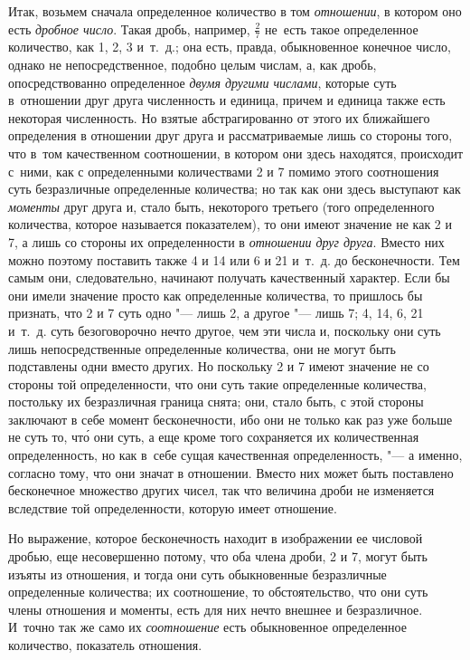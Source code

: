 Итак, возьмем сначала определенное количество в том {\em отношении}, в котором
оно есть {\em дробное число}. Такая дробь, например, $\frac 2 7$ не~есть такое
определенное количество, как 1, 2, 3 и~т.~д.; она есть, правда, обыкновенное
конечное число, однако не непосредственное, подобно целым числам, а, как дробь,
опосредствованно определенное {\em двумя другими числами}, которые суть
в~отношении друг друга численность и единица, причем и единица также есть
некоторая численность. Но взятые абстрагированно от этого их ближайшего
определения в отношении друг друга и рассматриваемые лишь со стороны того,
что в~том качественном соотношении, в котором они здесь находятся, происходит
с~ними, как с определенными количествами 2 и 7 помимо этого соотношения суть
безразличные определенные количества; но так как они здесь выступают как
{\em моменты} друг друга и, стало быть, некоторого третьего (того определенного
количества, которое называется показателем), то они имеют значение не как 2 и
7, а лишь со стороны их определенности в {\em отношении друг друга}. Вместо них
можно поэтому поставить также 4 и 14 или 6 и 21 и~т.~д. до бесконечности. Тем
самым они, следовательно, начинают получать качественный характер. Если бы они
имели значение просто как определенные количества, то пришлось бы признать, что
2 и 7 суть одно "--- лишь 2, а другое "--- лишь 7; 4, 14, 6, 21 и~т.~д. суть
безоговорочно нечто другое, чем эти числа и, поскольку они суть лишь
непосредственные определенные количества, они не могут быть подставлены одни
вместо других. Но поскольку 2 и 7 имеют значение не со стороны той
определенности, что они суть такие определенные количества, постольку их
безразличная граница снята; они, стало быть, с этой стороны заключают в себе
момент бесконечности, ибо они не только как раз уже больше не суть то, чт\'{о}
они суть, а еще кроме того сохраняется их количественная определенность, но как
в~себе сущая качественная определенность, "--- а именно, согласно тому, что они
значат в отношении. Вместо них может быть поставлено бесконечное множество
других чисел, так что величина дроби не изменяется вследствие той
определенности, которую имеет отношение.

Но выражение, которое бесконечность находит в изображении ее числовой дробью,
еще несовершенно потому, что оба члена дроби, 2 и 7, могут быть изъяты из
отношения, и тогда они суть обыкновенные безразличные определенные количества;
их соотношение, то обстоятельство, что они суть члены отношения и моменты, есть
для них нечто внешнее и безразличное. И~точно так же само их {\em соотношение}
есть обыкновенное определенное количество, показатель отношения.

